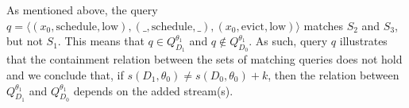 As mentioned above, the query $q = \langle
(x_0,\text{schedule},\text{low}),(\_,\text{schedule},\_),(x_0,\text{evict},\text{low})
\rangle$ matches $S_2$ and $S_3$, but not $S_1$.
This means that $q \in Q_{D_1}^{\theta_1}$ and $q \notin
Q_{D_0}^{\theta_1}$. As such, query $q$ illustrates that the containment
relation between the sets of matching queries does not hold and we conclude
that, if $s(D_1,\theta_0)\neq s(D_0,\theta_0) +k$, then the relation between
$Q_{D_1}^{\theta_1}$ and $Q_{D_0}^{\theta_1}$ depends on the added stream(s).


%


%

